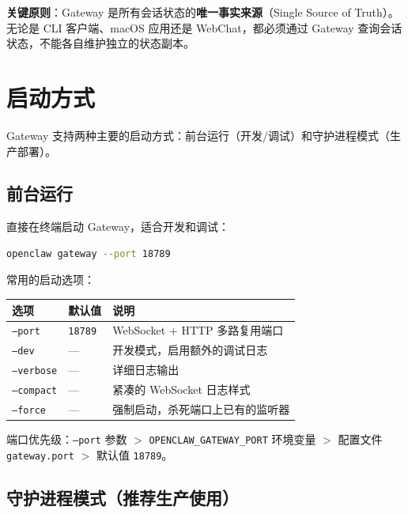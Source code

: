 \noindent \textbf{关键原则}：Gateway 是所有会话状态的\textbf{唯一事实来源}（Single Source of Truth）。
无论是 CLI 客户端、macOS 应用还是 WebChat，都必须通过 Gateway 查询会话状态，不能各自维护独立的状态副本。

\section{启动方式}

Gateway 支持两种主要的启动方式：前台运行（开发/调试）和守护进程模式（生产部署）。

\subsection{前台运行}

直接在终端启动 Gateway，适合开发和调试：

\begin{lstlisting}[language=bash]
openclaw gateway --port 18789
\end{lstlisting}

常用的启动选项：

\begin{center}
\begin{tabular}{lll}
\toprule
\textbf{选项} & \textbf{默认值} & \textbf{说明} \\
\midrule
\texttt{--port} & \texttt{18789} & WebSocket + HTTP 多路复用端口 \\
\texttt{--dev} & --- & 开发模式，启用额外的调试日志 \\
\texttt{--verbose} & --- & 详细日志输出 \\
\texttt{--compact} & --- & 紧凑的 WebSocket 日志样式 \\
\texttt{--force} & --- & 强制启动，杀死端口上已有的监听器 \\
\bottomrule
\end{tabular}
\end{center}

\noindent 端口优先级：\texttt{--port} 参数 $>$ \texttt{OPENCLAW\_GATEWAY\_PORT} 环境变量 $>$ 配置文件 \texttt{gateway.port} $>$ 默认值 \texttt{18789}。

\subsection{守护进程模式（推荐生产使用）}

